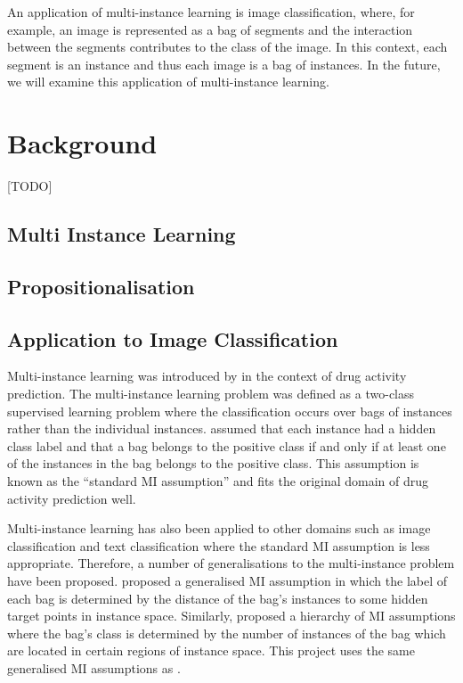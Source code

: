 \documentclass[a4paper,12pt]{report} %
\begin{document}
An application of multi-instance learning is image classification,
    where, for example, 
    an image is represented as a bag of segments and 
    the interaction between the segments contributes 
    to the class of the image. 
In this context, 
    each segment is an instance and 
    thus each image is a bag of instances. 
In the future, we will examine this application of multi-instance learning.

\tableofcontents

\chapter{Background}

[TODO]
\section{Multi Instance Learning}
\section{Propositionalisation}
\section{Application to Image Classification}

Multi-instance learning was introduced by  
    in the context of drug activity prediction. 
The multi-instance learning problem was 
    defined as a two-class supervised learning problem where 
    the classification occurs over bags of instances 
    rather than the individual instances. 
 assumed that each instance had a hidden class label and 
    that a bag belongs to the positive class if and only if 
    at least one of the instances in the bag belongs to the positive class. 
This assumption is known as the ``standard MI assumption'' and 
    fits the original domain of drug activity prediction well.

Multi-instance learning has also been applied to other domains 
    such as image classification and text classification where 
    the standard MI assumption is less appropriate. 
Therefore, a number of generalisations to the multi-instance problem have been proposed.
 proposed a generalised MI assumption in which 
    the label of each bag is determined by the 
    distance of the bag's instances to some hidden target points in instance space.
Similarly,  proposed a hierarchy of MI assumptions where 
    the bag's class is determined by the number of instances 
    of the bag which are located in certain regions of instance space.
This project uses the same generalised MI assumptions as .
\end{document}
